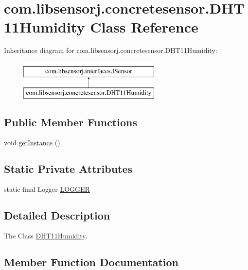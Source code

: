 \hypertarget{classcom_1_1libsensorj_1_1concretesensor_1_1DHT11Humidity}{}\section{com.\+libsensorj.\+concretesensor.\+D\+H\+T11\+Humidity Class Reference}
\label{classcom_1_1libsensorj_1_1concretesensor_1_1DHT11Humidity}
Inheritance diagram for com.\+libsensorj.\+concretesensor.\+D\+H\+T11\+Humidity\+:\begin{figure}[H]
\begin{center}
\leavevmode
\includegraphics[height=2.000000cm]{classcom_1_1libsensorj_1_1concretesensor_1_1DHT11Humidity}
\end{center}
\end{figure}
\subsection*{Public Member Functions}
\begin{DoxyCompactItemize}
\item 
void \hyperlink{classcom_1_1libsensorj_1_1concretesensor_1_1DHT11Humidity_a2355dc003abad8d519440e9f6871c422}{get\+Instance} ()
\end{DoxyCompactItemize}
\subsection*{Static Private Attributes}
\begin{DoxyCompactItemize}
\item 
static final Logger \hyperlink{classcom_1_1libsensorj_1_1concretesensor_1_1DHT11Humidity_a80655575ba16db014b7a1a797e030eae}{L\+O\+G\+G\+E\+R}
\end{DoxyCompactItemize}


\subsection{Detailed Description}
The Class \hyperlink{classcom_1_1libsensorj_1_1concretesensor_1_1DHT11Humidity}{D\+H\+T11\+Humidity}. 

\subsection{Member Function Documentation}
\hypertarget{classcom_1_1libsensorj_1_1concretesensor_1_1DHT11Humidity_a2355dc003abad8d519440e9f6871c422}{}

